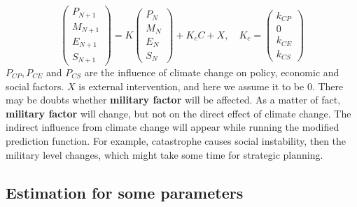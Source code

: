 \documentclass{mcmthesis}
\begin{document}
	$$
	\left(
	\begin{matrix}
	P_{N+1} \\ M_{N+1} \\ E_{N+1} \\ S_{N+1}
	\end{matrix}
	\right) 
	= 
	K 
	\left(
	\begin{matrix}
	P_N \\ M_N \\ E_N \\ S_N
	\end{matrix}
	\right) 
	+
	K_c
	C
	+ X
	, \quad
	K_c = 
	\left(
	\begin{matrix}
	k_{CP} \\ {0} \\ k_{CE} \\ k_{CS}
	\end{matrix}
	\right)
	$$
	$P_{CP},P_{CE}$ and $P_{CS}$ are the influence of climate change on policy, economic and social factors. $X$ is external intervention, and here we assume it to be 0. There may be doubts whether \textbf{military factor} will be affected. As a matter of fact, \textbf{military factor} will change, but not on the direct effect of climate change. The indirect influence from climate change will appear while running the modified prediction function. For example, catastrophe causes social instability, then the military level changes, which might take some time for strategic planning.
	
	
	\subsection{Estimation for some parameters}
	
\end{document}
